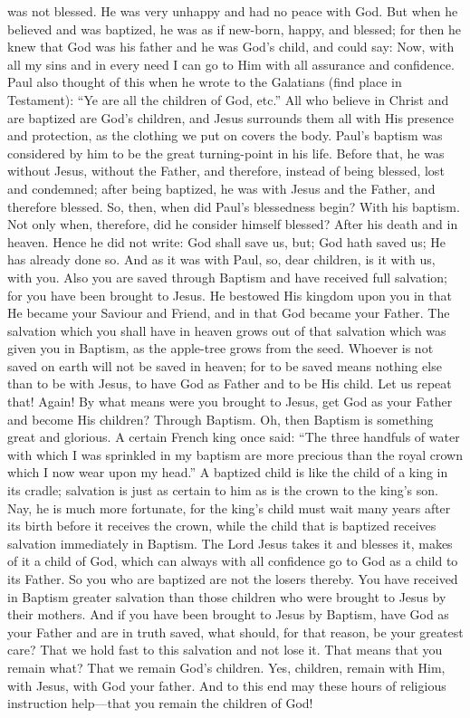 was not blessed. He was very unhappy and had no peace with God. But when he believed and was baptized, he was as if new-born, happy, and blessed; for then he knew that God was his father and he was God’s child, and could say: Now, with all my sins and in every need I can go to Him with all assurance and confidence. Paul also thought of this when he wrote to the Galatians (find place in Testament): “Ye are all the children of God, etc.” All who believe in Christ and are baptized are God’s children, and Jesus surrounds them all with His presence and protection, as the clothing we put on covers the body. Paul’s baptism was considered by him to be the great turning-point in his life. Before that, he was without Jesus, without the Father, and therefore, instead of being blessed, lost and condemned; after being baptized, he was with Jesus and the Father, and therefore blessed. So, then, when did Paul’s blessedness begin? With his baptism. Not only when, therefore, did he consider himself blessed? After his death and in heaven. Hence he did not write: God shall save us, but; God hath saved us; He has already done so. And as it was with Paul, so, dear children, is it with us, with you. Also you are saved through Baptism and have received full salvation; for you have been brought to Jesus. He bestowed His kingdom upon you in that He became your Saviour and Friend, and in that God became your Father. The salvation which you shall have in heaven grows out of that salvation which was given you in Baptism, as the apple-tree grows from the seed. Whoever is not saved on earth will not be saved in heaven; for to be saved means nothing else than to be with Jesus, to have God as Father and to be His child. Let us repeat that! Again! By what means were you brought to Jesus, get God as your Father and become His children? Through Baptism. Oh, then Baptism is something great and glorious. A certain French king once said: “The three handfuls of water with which I was sprinkled in my baptism are more precious than the royal crown which I now wear upon my head.” A baptized child is like the child of a king in its cradle; salvation is just as certain to him as is the crown to the king’s son. Nay, he is much more fortunate, for the king’s child must wait many years after its birth before it receives the crown, while the child that is baptized receives salvation immediately in Baptism. The Lord Jesus takes it and blesses it, makes of it a child of God, which can always with all confidence go to God as a child to its Father. So you who are baptized are not the losers thereby. You have received in Baptism greater salvation than those children
who were brought to Jesus by their mothers. And if you have been brought to Jesus by Baptism, have God as your Father and are in truth saved, what should, for that reason, be your greatest care? That we hold fast to this salvation and not lose it. That means that you remain what? That we remain God’s children. Yes, children, remain with Him, with Jesus, with God your father. And to this end may these hours of religious instruction help—that you remain the children of God!


